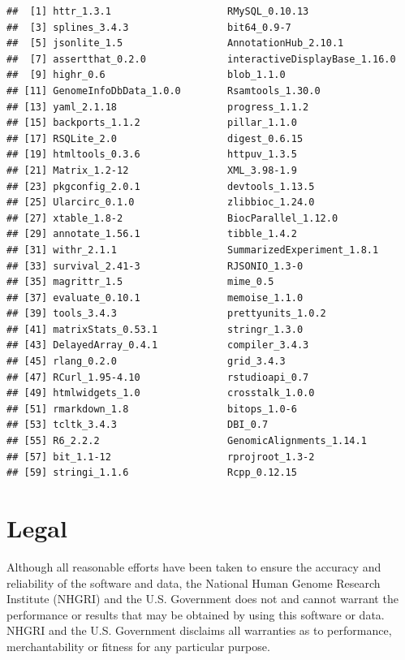 \documentclass[12pt]{article}\usepackage[]{graphicx}\usepackage[]{color}
\makeatletter
\newenvironment{kframe}{%
 \def\at@end@of@kframe{}%
 \ifinner\ifhmode%
  \def\at@end@of@kframe{\end{minipage}}%
  \begin{minipage}{\columnwidth}%
 \fi\fi%
 \def\FrameCommand##1{\hskip\@totalleftmargin \hskip-\fboxsep
 \colorbox{shadecolor}{##1}\hskip-\fboxsep
     \hskip-\linewidth \hskip-\@totalleftmargin \hskip\columnwidth}%
 \MakeFramed {\advance\hsize-\width
   \@totalleftmargin\z@ \linewidth\hsize
   \@setminipage}}%
 {\par\unskip\endMakeFramed%
 \at@end@of@kframe}
\newenvironment{knitrout}{}{} %
\makeatother
\begin{document}
\begin{knitrout}
\begin{kframe}
\begin{verbatim}
##  [1] httr_1.3.1                    RMySQL_0.10.13               
##  [3] splines_3.4.3                 bit64_0.9-7                  
##  [5] jsonlite_1.5                  AnnotationHub_2.10.1         
##  [7] assertthat_0.2.0              interactiveDisplayBase_1.16.0
##  [9] highr_0.6                     blob_1.1.0                   
## [11] GenomeInfoDbData_1.0.0        Rsamtools_1.30.0             
## [13] yaml_2.1.18                   progress_1.1.2               
## [15] backports_1.1.2               pillar_1.1.0                 
## [17] RSQLite_2.0                   digest_0.6.15                
## [19] htmltools_0.3.6               httpuv_1.3.5                 
## [21] Matrix_1.2-12                 XML_3.98-1.9                 
## [23] pkgconfig_2.0.1               devtools_1.13.5              
## [25] Ularcirc_0.1.0                zlibbioc_1.24.0              
## [27] xtable_1.8-2                  BiocParallel_1.12.0          
## [29] annotate_1.56.1               tibble_1.4.2                 
## [31] withr_2.1.1                   SummarizedExperiment_1.8.1   
## [33] survival_2.41-3               RJSONIO_1.3-0                
## [35] magrittr_1.5                  mime_0.5                     
## [37] evaluate_0.10.1               memoise_1.1.0                
## [39] tools_3.4.3                   prettyunits_1.0.2            
## [41] matrixStats_0.53.1            stringr_1.3.0                
## [43] DelayedArray_0.4.1            compiler_3.4.3               
## [45] rlang_0.2.0                   grid_3.4.3                   
## [47] RCurl_1.95-4.10               rstudioapi_0.7               
## [49] htmlwidgets_1.0               crosstalk_1.0.0              
## [51] rmarkdown_1.8                 bitops_1.0-6                 
## [53] tcltk_3.4.3                   DBI_0.7                      
## [55] R6_2.2.2                      GenomicAlignments_1.14.1     
## [57] bit_1.1-12                    rprojroot_1.3-2              
## [59] stringi_1.1.6                 Rcpp_0.12.15
\end{verbatim}
\end{kframe}
\end{knitrout}

\section{Legal} \label{sec:legal}


Although all reasonable efforts have been taken to ensure the
accuracy and reliability of the software and data, the National
Human Genome Research Institute (NHGRI) and the U.S. Government
does not and cannot warrant the performance or results that may
be obtained by using this software or data.  NHGRI and the U.S.
Government disclaims all warranties as to performance,
merchantability or fitness for any particular purpose.
\end{document}

